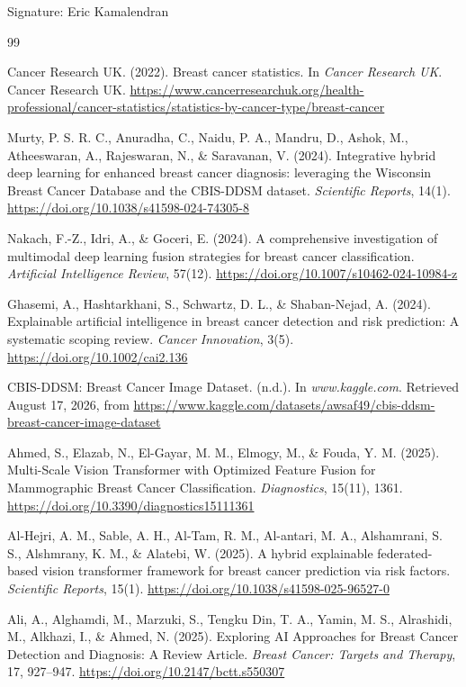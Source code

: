 Signature: Eric Kamalendran

\begin{thebibliography}{99}

Cancer Research UK. (2022). Breast cancer statistics. In \emph{Cancer Research UK}. Cancer Research UK. \url{https://www.cancerresearchuk.org/health-professional/cancer-statistics/statistics-by-cancer-type/breast-cancer}

Murty, P. S. R. C., Anuradha, C., Naidu, P. A., Mandru, D., Ashok, M., Atheeswaran, A., Rajeswaran, N., \& Saravanan, V. (2024). Integrative hybrid deep learning for enhanced breast cancer diagnosis: leveraging the Wisconsin Breast Cancer Database and the CBIS-DDSM dataset. \emph{Scientific Reports}, 14(1). \url{https://doi.org/10.1038/s41598-024-74305-8}

Nakach, F.-Z., Idri, A., \& Goceri, E. (2024). A comprehensive investigation of multimodal deep learning fusion strategies for breast cancer classification. \emph{Artificial Intelligence Review}, 57(12). \url{https://doi.org/10.1007/s10462-024-10984-z}

Ghasemi, A., Hashtarkhani, S., Schwartz, D. L., \& Shaban-Nejad, A. (2024). Explainable artificial intelligence in breast cancer detection and risk prediction: A systematic scoping review. \emph{Cancer Innovation}, 3(5). \url{https://doi.org/10.1002/cai2.136}

CBIS-DDSM: Breast Cancer Image Dataset. (n.d.). In \emph{www.kaggle.com}. Retrieved August 17, 2026, from \url{https://www.kaggle.com/datasets/awsaf49/cbis-ddsm-breast-cancer-image-dataset}

Ahmed, S., Elazab, N., El-Gayar, M. M., Elmogy, M., \& Fouda, Y. M. (2025). Multi-Scale Vision Transformer with Optimized Feature Fusion for Mammographic Breast Cancer Classification. \emph{Diagnostics}, 15(11), 1361. \url{https://doi.org/10.3390/diagnostics15111361}

Al-Hejri, A. M., Sable, A. H., Al-Tam, R. M., Al-antari, M. A., Alshamrani, S. S., Alshmrany, K. M., \& Alatebi, W. (2025). A hybrid explainable federated-based vision transformer framework for breast cancer prediction via risk factors. \emph{Scientific Reports}, 15(1). \url{https://doi.org/10.1038/s41598-025-96527-0}

Ali, A., Alghamdi, M., Marzuki, S., Tengku Din, T. A., Yamin, M. S., Alrashidi, M., Alkhazi, I., \& Ahmed, N. (2025). Exploring AI Approaches for Breast Cancer Detection and Diagnosis: A Review Article. \emph{Breast Cancer: Targets and Therapy}, 17, 927--947. \url{https://doi.org/10.2147/bctt.s550307}


\end{thebibliography}
